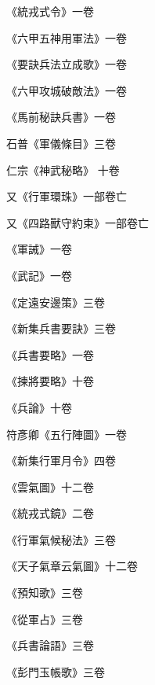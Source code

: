 \begin{pinyinscope}
 《統戎式令》一卷



 《六甲五神用軍法》一卷



 《要訣兵法立成歌》一卷



 《六甲攻城破敵法》一卷



 《馬前秘訣兵書》一卷



 石普《軍儀條目》三卷



 仁宗《神武秘略》
 十卷



 又《行軍環珠》一部卷亡



 又《四路獸守約束》一部卷亡



 《軍誡》一卷



 《武記》一卷



 《定遠安邊策》三卷



 《新集兵書要訣》三卷



 《兵書要略》一卷



 《揀將要略》十卷



 《兵論》十卷



 符彥卿《五行陣圖》一卷



 《新集行軍月令》四卷



 《雲氣圖》十二卷



 《統戎式鏡》二卷



 《行軍氣候秘法》三卷



 《天子氣章云氣圖》十二卷



 《預知歌》三卷



 《從軍占》三卷



 《兵書論語》三卷



 《彭門玉帳歌》三卷




\end{pinyinscope}
